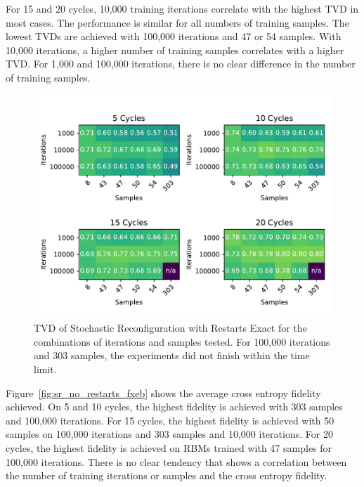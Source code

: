 For 15 and 20 cycles, 10,000 training iterations correlate with the highest TVD in most cases.
The performance is similar for all numbers of training samples. The lowest TVDs are achieved with 100,000
iterations and 47 or 54 samples. With 10,000 iterations, a higher number of training samples correlates 
with a higher TVD. For 1,000 and 100,000 iterations, there is no clear difference in the number of training 
samples.

\begin{figure}[H]
  \centering
  \includegraphics[width=\textwidth]{figures/results/SR-restarts-not-learned/tvd_heatmap.pdf}
  \caption[TVD of Stochastic Reconfiguration with Restarts Exact]{TVD of Stochastic 
  Reconfiguration with Restarts Exact for the combinations of iterations and samples tested.
  For 100,000 iterations and 303 samples, the experiments did not finish within the time limit.}
  \label{fig:sr_exact_tvd}
\end{figure}

Figure~\ref{fig:sr_no_restarts_fxeb} shows the average cross entropy fidelity achieved. On 5 and 10
cycles, the highest fidelity is achieved with 303 samples and 100,000 iterations. 
For 15 cycles, the highest fidelity is achieved with 50 samples on 100,000 iterations and 
303 samples and 10,000 iterations.
For 20 cycles, the highest fidelity is achieved on RBMs trained with 47 samples for 100,000 iterations.
There is no clear tendency that shows a correlation between 
the number of training iterations or samples and the cross entropy fidelity.

